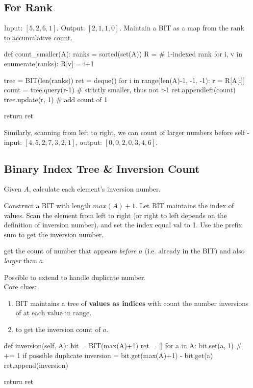 \subsection{For Rank}
 Input: $[5,2,6,1]$. Output: $[2,1,1,0]$. 
 Maintain a BIT as a map from the rank to accumulative count.
\begin{python}
def count_smaller(A):
    ranks = sorted(set(A))
    R = {}  # 1-indexed rank
    for i, v in enumerate(ranks):
        R[v] = i+1
    
    tree = BIT(len(ranks))
    ret = deque()
    for i in range(len(A)-1, -1, -1):
        r = R[A[i]]
        count = tree.query(r-1)
        # strictly smaller, thus not r-1
        ret.appendleft(count)
        tree.update(r, 1)  # add count of 1
    
    return ret
\end{python}

Similarly, scanning from left to right, we can count of larger numbers before self - input: $[4,5,2,7,3,2,1]$, output: $[0,0,2,0,3,4,6]$. 

\subsection{Binary Index Tree \& Inversion Count}
Given $A$, calculate each element's inversion number. 

Construct a BIT with length $max(A)+1$. Let BIT maintains the index of values. Scan the element from left to right (or right to left depends on the definition of inversion number), and set the index equal val to 1. Use the prefix sum to get the inversion number.

 get the count of number that appears \textit{before} $a$ (i.e. already in the BIT) and also \textit{larger} than $a$. 

Possible to extend to handle duplicate number. 
\\
Core clues:
\begin{enumerate}
\item BIT maintains a tree of \textbf{values as indices} with count the number inversions of at each value in range.
\item {} to get the inversion count of $a$.
\end{enumerate}
\begin{python}
def inversion(self, A):
    bit = BIT(max(A)+1)
    ret = []
    for a in A:
        bit.set(a, 1)  # += 1 if possible duplicate 
        inversion = bit.get(max(A)+1) - bit.get(a)
        ret.append(inversion)

    return ret
\end{python}


